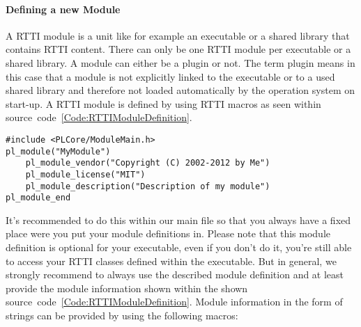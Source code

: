 \paragraph{Defining a new Module}
A \ac{RTTI} module is a unit like for example an executable or a shared library that contains \ac{RTTI} content. There can only be one \ac{RTTI} module per executable or a shared library. A module can either be a plugin or not. The term plugin means in this case that a module is not explicitly linked to the executable or to a used shared library and therefore not loaded automatically by the operation system on start-up. A \ac{RTTI} module is defined by using \ac{RTTI} macros as seen within source~code~\ref{Code:RTTIModuleDefinition}.
\begin{lstlisting}[float=htb,label=Code:RTTIModuleDefinition,caption={Defining a new \ac{RTTI} module}]
#include <PLCore/ModuleMain.h>
pl_module("MyModule")
	pl_module_vendor("Copyright (C) 2002-2012 by Me")
	pl_module_license("MIT")
	pl_module_description("Description of my module")
pl_module_end
\end{lstlisting}
It's recommended to do this within our main file so that you always have a fixed place were you put your module definitions in. Please note that this module definition is optional for your executable, even if you don't do it, you're still able to access your \ac{RTTI} classes defined within the executable. But in general, we strongly recommend to always use the described module definition and at least provide the module information shown within the shown source~code~\ref{Code:RTTIModuleDefinition}. Module information in the form of strings can be provided by using the following macros:
